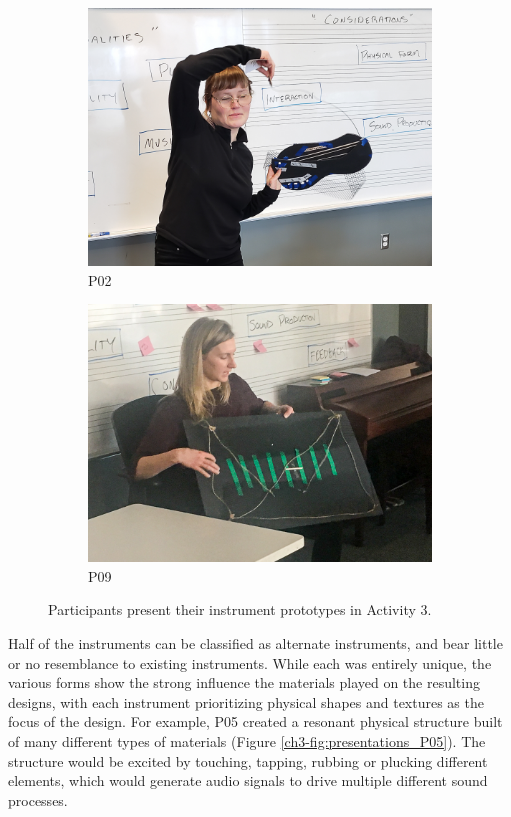 \documentclass[letterpaper, 12pt]{article}
\begin{document}
\begin{figure}[t]
\begin{subfigure}{0.49\textwidth}
        \includegraphics[width=1\textwidth]{CMJ3.jpg}
        \caption{P02}
        \label{ch3-fig:presentations_P02}
    \end{subfigure}
    \begin{subfigure}{0.49\textwidth}
        \centering
        \includegraphics[width=1\textwidth]{CMJ4.jpg}
        \caption{P09}
        \label{ch3-fig:presentations_P09}
    \end{subfigure}
    \caption{Participants present their instrument prototypes in Activity 3.}
    \label{ch3-fig:presentations}
\end{figure}

Half of the instruments can be classified as alternate instruments, and bear little or no resemblance to existing instruments. While each was entirely unique, the various forms show the strong influence the materials played on the resulting designs, with each instrument prioritizing physical shapes and textures as the focus of the design. For example, P05 created a resonant physical structure built of many different types of materials (Figure \ref{ch3-fig:presentations_P05}). The structure would be excited by touching, tapping, rubbing or plucking different elements, which would generate audio signals to drive multiple different sound processes.
\end{document}
